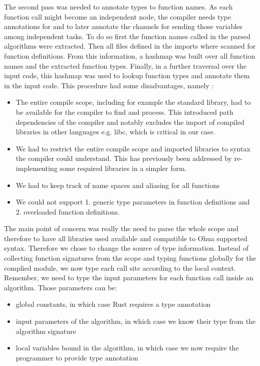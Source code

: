 The second pass was needed to annotate types to function names. As each function call  might become an independent node, the compiler needs type annotations for  and  to later annotate the channels for sending those variables among independent tasks. To do so first the function names called in the parsed algorithms were extracted. Then all files defined in the imports where scanned for function definitions. From this information, a hashmap was built over all function names and the extracted function types. Finally, in a further traversal over the input code, this hashmap was used to lookup function types and annotate them in the input code. This procedure had some disadvantages, namely : 

\begin{itemize}
    \item The entire compile scope, including for example the standard library, had to be available for the compiler to find and process. This introduced path dependencies of the compiler and notably excludes the import of compiled libraries in other languages e.g. libc, which is critical in our case.
    \item We had to restrict the entire compile scope and imported libraries to syntax the compiler could understand. This has previously been addressed by re-implementing some required libraries in a simpler form. 
    \item We had to keep track of name spaces and aliasing for all functions
    \item We could not support 1. generic type parameters in function definitions and 2. overloaded function definitions.
\end{itemize}

The main point of concern was really the need to parse the whole scope and therefore to have all libraries used available and compatible to Ohua supported syntax. Therefore we chose to change the source of type information. Instead of collecting function signatures from the scope and typing functions globally for the complied module, we now type each call site according to the local context. Remember, we need to type the input parameters for each function call inside an algorithm. Those parameters can be: 

\begin{itemize}
    \item global constants, in which case Rust requires a type annotation
    \item input parameters of the algorithm, in which case we know their type from the algorithm signature
    \item local variables bound in the algorithm, in which case we now require the programmer to provide type annotation 
\end{itemize}

